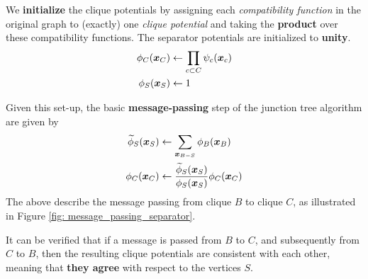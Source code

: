 \documentclass[11pt]{article}
\begin{document}
We \textbf{initialize} the clique potentials by assigning each \emph{compatibility function} in the original graph to (exactly) one \emph{clique potential} and taking the \textbf{product} over these compatibility functions. The separator potentials are initialized to \textbf{unity}.
\begin{align*}
\phi_{C}(\boldsymbol{x}_{C}) &\leftarrow \prod_{c \subset C}\psi_{c}(\boldsymbol{x}_c) \\
\phi_{S}(\boldsymbol{x}_{S}) &\leftarrow 1  
\end{align*}


Given this set-up, the basic \textbf{message-passing} step of the junction tree algorithm are given by
\begin{align}
\widetilde{\phi}_{S}(\boldsymbol{x}_{S}) &\leftarrow \sum_{\boldsymbol{x}_{B - S}}\phi_{B}(\boldsymbol{x}_{B}) \label{eqn: junction_tree_message_passing_separator}\\
\phi_{C}(\boldsymbol{x}_{C}) & \leftarrow \frac{\widetilde{\phi}_{S}(\boldsymbol{x}_{S}) }{\phi_{S}(\boldsymbol{x}_{S})}\phi_{C}(\boldsymbol{x}_{C}) \label{eqn: junction_tree_message_passing_clique}
\end{align} The above describe the message passing from clique $B$ to clique $C$, as illustrated in Figure \ref{fig: message_passing_separator}. 

It can be verified that if a message is passed from $B$ to $C$, and subsequently from $C$ to $B$, then the resulting clique potentials are consistent with each other, meaning
that \textbf{they agree} with respect to the vertices $S$.

\newpage


\end{document}
